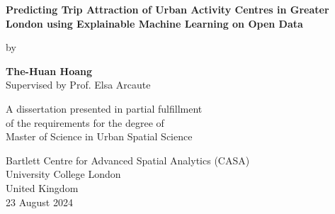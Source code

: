 
 \begin{titlepage}
    \begin{center}
        \vspace*{-3cm}
        
        \vfill %
        

        {\LARGE\textbf{Predicting Trip Attraction of Urban Activity Centres in Greater London using Explainable Machine Learning on Open Data\\}} 

        \vspace{2cm}
        by\\
        \vspace{1cm}
    
        \textbf{The-Huan Hoang\\}
        \vspace{0.2cm}
        Supervised by Prof. Elsa Arcaute\\
    
        \vfill
             
        A dissertation presented in partial fulfillment \\
        of the requirements for the degree of\\
        Master of Science in Urban Spatial Science
             
        \vspace{1cm}
                 
        Bartlett Centre for Advanced Spatial Analytics (CASA) \\
        University College London\\
        United Kingdom\\
        23 August 2024
    
    \end{center}
\end{titlepage}
